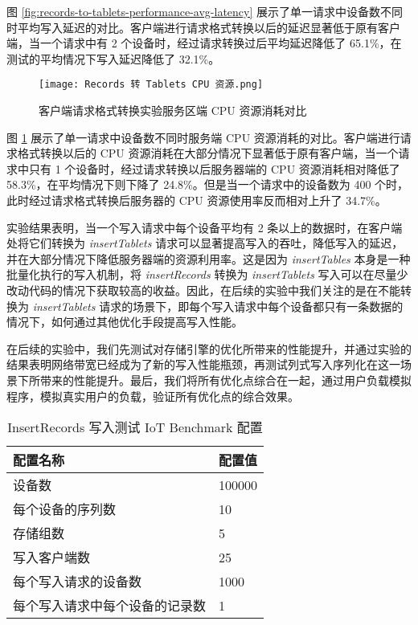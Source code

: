 图 \ref{fig:records-to-tablets-performance-avg-latency} 展示了单一请求中设备数不同时平均写入延迟的对比。客户端进行请求格式转换以后的延迟显著低于原有客户端，当一个请求中有 2 个设备时，经过请求转换过后平均延迟降低了 65.1\%，在测试的平均情况下写入延迟降低了 32.1\%。

\begin{figure}
  \centering
  \texttt{[image: Records 转 Tablets CPU 资源.png]}
  \caption{客户端请求格式转换实验服务区端 CPU 资源消耗对比}
  \label{fig:records-to-tablets-performance-cpu-consuming}
\end{figure}

图 \ref{fig:records-to-tablets-performance-cpu-consuming} 展示了单一请求中设备数不同时服务端 CPU 资源消耗的对比。客户端进行请求格式转换以后的 CPU 资源消耗在大部分情况下显著低于原有客户端，当一个请求中只有 1 个设备时，经过请求转换以后服务器端的 CPU 资源消耗相对降低了 58.3\%，在平均情况下则下降了 24.8\%。但是当一个请求中的设备数为 400 个时，此时经过请求格式转换后服务器的 CPU 资源使用率反而相对上升了 34.7\%。 %

实验结果表明，当一个写入请求中每个设备平均有 2 条以上的数据时，在客户端处将它们转换为 \emph{insertTablets} 请求可以显著提高写入的吞吐，降低写入的延迟，并在大部分情况下降低服务器端的资源利用率。这是因为 \emph{insertTables} 本身是一种批量化执行的写入机制，将 \emph{insertRecords} 转换为 \emph{insertTablets} 写入可以在尽量少改动代码的情况下获取较高的收益。因此，在后续的实验中我们关注的是在不能转换为 \emph{insertTablets} 请求的场景下，即每个写入请求中每个设备都只有一条数据的情况下，如何通过其他优化手段提高写入性能。

在后续的实验中，我们先测试对存储引擎的优化所带来的性能提升，并通过实验的结果表明网络带宽已经成为了新的写入性能瓶颈，再测试列式写入序列化在这一场景下所带来的性能提升。最后，我们将所有优化点综合在一起，通过用户负载模拟程序，模拟真实用户的负载，验证所有优化点的综合效果。

\begin{table}
  \centering
  \caption{InsertRecords 写入测试 IoT Benchmark 配置}
  \begin{tabular}{ll}
    \toprule
    配置名称 & 配置值 \\
    \midrule 
    设备数 & 100000 \\
    每个设备的序列数 & 10 \\
    存储组数 & 5 \\
    写入客户端数 & 25 \\
    每个写入请求的设备数 & 1000 \\
    每个写入请求中每个设备的记录数 & 1 \\
    \bottomrule
  \end{tabular}
  \label{tabular:test-req-format-iot-benchmark-config-2}
\end{table}

